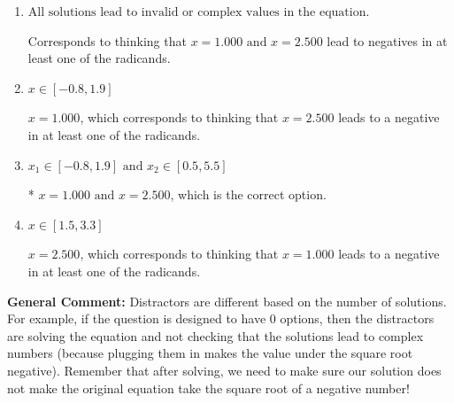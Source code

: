 \documentclass{extbook}[14pt]
\begin{document}
\begin{enumerate}
{\begin{enumerate}[label=\Alph*.]
$x = -2.500 \text{ and } x = -1.000$, which are the negative or absolute values of the values you would have gotten by solving the equation correctly.
\item \( \text{All solutions lead to invalid or complex values in the equation.} \)

Corresponds to thinking that $x = 1.000 \text{ and } x = 2.500$ lead to negatives in at least one of the radicands.
\item \( x \in [-0.8,1.9] \)

$x = 1.000$, which corresponds to thinking that $x = 2.500$ leads to a negative in at least one of the radicands.
\item \( x_1 \in [-0.8, 1.9] \text{ and } x_2 \in [0.5,5.5] \)

* $x = 1.000 \text{ and } x = 2.500$, which is the correct option.
\item \( x \in [1.5,3.3] \)

$x = 2.500$, which corresponds to thinking that $x = 1.000$ leads to a negative in at least one of the radicands.
\end{enumerate}

\textbf{General Comment:} Distractors are different based on the number of solutions. For example, if the question is designed to have 0 options, then the distractors are solving the equation and not checking that the solutions lead to complex numbers (because plugging them in makes the value under the square root negative). Remember that after solving, we need to make sure our solution does not make the original equation take the square root of a negative number!
}
\end{enumerate}
\end{document}
